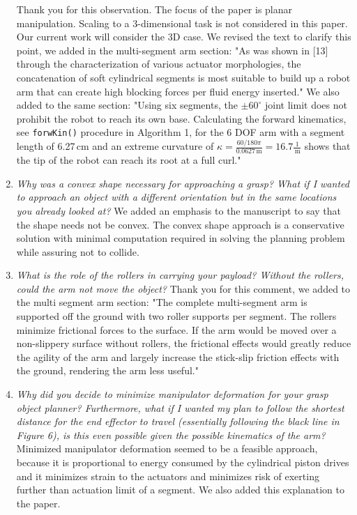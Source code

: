 \documentclass[letterpaper, 10 pt, twocolumn, conference]{article}
\newcommand{\unit}[1]{\ensuremath{\, \mathrm{#1}}} %
\begin{document}
\begin{enumerate}
%
Thank you for this observation. The focus of the paper is planar manipulation. Scaling to a 3-dimensional task is not considered in this paper. Our current work will consider the 3D case.
We revised the text to clarify this point, we added in the multi-segment arm section: 
"As was shown in [13] through the characterization of various actuator morphologies, the concatenation of soft cylindrical segments is most suitable to build up a robot arm that can create high blocking forces per fluid energy inserted."
We also added to the same section:
"Using six segments, the $\pm 60^\circ$ joint limit does not prohibit the robot to reach its own base. Calculating the forward kinematics, see \texttt{forwKin()} procedure in Algorithm 1, for the 6 DOF arm with a segment length of 6.27\unit{cm} and an extreme curvature of $\kappa = \frac{60/180 \pi}{0.0627\unit{m}} = 16.7\frac{1}{\unit{m}}$ shows that the tip of the robot can reach its root at a full curl." 
%
\item \textit{Why was a convex shape necessary for approaching a grasp? What if I wanted to approach an object with a different orientation but in the same locations you already looked at?}
%
We added an emphasis to the manuscript to say that the shape needs not be convex. The convex shape approach is a conservative solution with minimal computation required in solving the planning problem while assuring not to collide. 
%
\item \textit{What is the role of the rollers in carrying your payload? Without the rollers, could the arm not move the object?}
%
Thank you for this comment, we added to the multi segment arm section:
"The complete multi-segment arm is supported off the ground with two roller supports per segment. 
The rollers minimize frictional forces to the surface. 
If the arm would be moved over a non-slippery surface without rollers, the frictional effects would greatly reduce the agility of the arm and largely increase the stick-slip friction effects with the ground, rendering the arm less useful."
%
\item \textit{Why did you decide to minimize manipulator deformation for your grasp object planner? Furthermore, what if I wanted my plan to follow the shortest distance for the end effector to travel (essentially following the black line in Figure 6), is this even possible given the possible kinematics of the arm?}
%
Minimized manipulator deformation seemed to be a feasible approach, because it is proportional to energy consumed by the cylindrical piston drives and it minimizes strain to the actuators and minimizes risk of exerting further than actuation limit of a segment. We also added this explanation to the paper. 
%
\end{enumerate}
%
\end{document}
